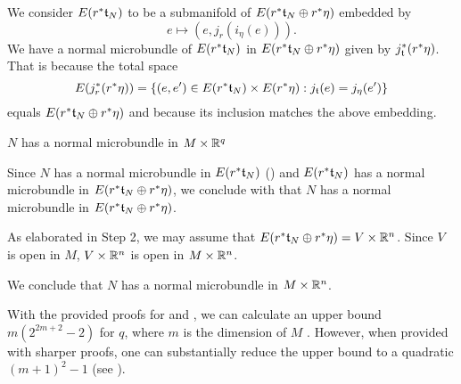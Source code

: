 \begin{scope}
\begin{myproof}
\begin{steps}
            We consider $E(r^*\mathfrak{t}_N)$ to be a submanifold of $E(r^*\mathfrak{t}_N \oplus{} r^*\eta)$ embedded by
            \[ e \mapsto (e, j_{r}(i_{\eta}(e))). \]
            We have a normal microbundle of $E(r^*\mathfrak{t}_N)$ in $E(r^*\mathfrak{t}_N \oplus{} r^*\eta)$ given by $j_{\mathfrak{t}}^*(r^*\eta)$.
            That is because the total space
            \[ E(j_r^*(r^*\eta)) = \{(e, e') \in E(r^*\mathfrak{t}_N) \times E(r^*\eta):j_{\mathfrak{t}}(e) = j_\eta(e')\} \]
            equals $E(r^*\mathfrak{t}_N \oplus{} r^*\eta)$ and because its inclusion matches the above embedding.
            
            \item $N$ has a normal microbundle in $M \times \mathbb{R}^q$
            
            Since $N$ has a normal microbundle in $E(r^*\mathfrak{t}_N)$ ()
            and $E(r^*\mathfrak{t}_N)$ has a normal microbundle in $E(r^*\mathfrak{t}_N \oplus{} r^*\eta)$,
            we conclude with  that
            $N$ has a normal microbundle in $E(r^*\mathfrak{t}_N \oplus{} r^*\eta)$.
            
            As elaborated in Step 2, we may assume that $E(r^*\mathfrak{t}_N \oplus{} r^*\eta) = V \times \mathbb{R}^n$.
            Since $V$ is open in $M$, $V \times \mathbb{R}^n$ is open in $M \times \mathbb{R}^n$.
        \end{steps}
        We conclude that $N$ has a normal microbundle in $M \times \mathbb{R}^n$.
    \end{myproof}

    \begin{myparagraph}
        With the provided proofs for  and ,
        we can calculate an upper bound $m(2^{2m + 2} - 2)$ for $q$, where $m$ is the dimension of $M$ \cite[p.63]{milnor}.
        However, when provided with sharper proofs,
        one can substantially reduce the upper bound
        to a quadratic $(m + 1)^2 - 1$ (see \cite[p.232]{hirsch}).
    \end{myparagraph}
\end{scope}